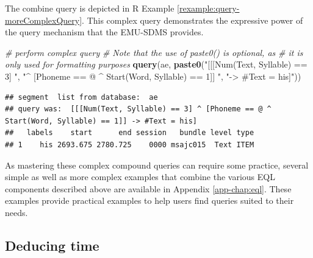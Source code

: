 \documentclass[]{book}
\newenvironment{Shaded}{\begin{snugshade}}{\end{snugshade}}
\newcommand{\CommentTok}[1]{\textcolor[rgb]{0.56,0.35,0.01}{\textit{#1}}}
\newcommand{\KeywordTok}[1]{\textcolor[rgb]{0.13,0.29,0.53}{\textbf{#1}}}
\newcommand{\NormalTok}[1]{#1}
\newcommand{\StringTok}[1]{\textcolor[rgb]{0.31,0.60,0.02}{#1}}
\theoremstyle{definition}
\theoremstyle{definition}
\theoremstyle{definition}
\theoremstyle{remark}
\begin{document}
The combine query is depicted in R Example
\ref{rexample:query-moreComplexQuery}. This complex query demonstrates
the expressive power of the query mechanism that the EMU-SDMS provides.

\begin{Shaded}
\begin{Highlighting}[]
\CommentTok{# perform complex query}
\CommentTok{# Note that the use of paste0() is optional, as}
\CommentTok{# it is only used for formatting purposes}
\KeywordTok{query}\NormalTok{(ae, }\KeywordTok{paste0}\NormalTok{(}\StringTok{"[[[Num(Text, Syllable) == 3] "}\NormalTok{,}
                 \StringTok{"^ [Phoneme == @ ^ Start(Word, Syllable) == 1]] "}\NormalTok{,}
                 \StringTok{"-> #Text = his]"}\NormalTok{))}
\end{Highlighting}
\end{Shaded}

\begin{verbatim}
## segment  list from database:  ae 
## query was:  [[[Num(Text, Syllable) == 3] ^ [Phoneme == @ ^ Start(Word, Syllable) == 1]] -> #Text = his] 
##   labels    start      end session   bundle level type
## 1    his 2693.675 2780.725    0000 msajc015  Text ITEM
\end{verbatim}

As mastering these complex compound queries can require some practice,
several simple as well as more complex examples that combine the various
EQL components described above are available in Appendix
\ref{app-chap:eql}. These examples provide practical examples to help
users find queries suited to their needs.

\hypertarget{subsec:query_deducingTime}{%
\subsection{Deducing time}\label{subsec:query_deducingTime}}
\end{document}
